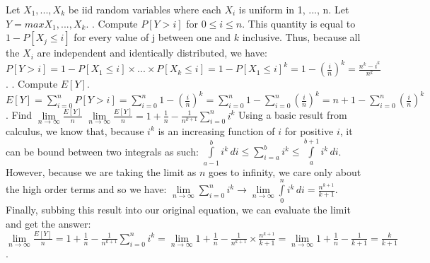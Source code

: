 \documentclass[12pt]{article}
\begin{document}

Let $X_1, ..., X_k$ be iid random variables where each $X_i$ is uniform in {1, ..., n}. Let $Y = max{X_1, ..., X_k}$.
\newline
{}. Compute $P[Y>i]$ for $0 \leq i \leq n$.
\newline
\newline
This quantity is equal to $1 - P[X_j \leq i]$ for every value of j between one and $k$ inclusive. Thus, 
because all the $X_i$ are independent and identically distributed, we have:
\newline
\newline
$P[Y > i] = 1 - P[X_1 \leq i] \times ... \times P[X_k \leq i] = 1 - P[X_1 \leq i]^k = 1 - (\frac{i}{n})^k = \frac{n^k - i^k}{n^k}$.
\newline
{}. Compute $E[Y]$.
\newline
\newline
$E[Y] = \sum\limits_{i=0}^{n} P[Y>i] = \sum\limits_{i=0}^{n} 1 - (\frac{i}{n})^k = \sum\limits_{i=0}^{n} 1 - \sum\limits_{i=0}^{n} (\frac{i}{n})^k = n + 1 - \sum\limits_{i=0}^{n} (\frac{i}{n})^k$
\newline
{}. Find $\lim\limits_{n \rightarrow \infty} \frac{E[Y]}{n}$
\newline
\newline
$\lim\limits_{n \rightarrow \infty} \frac{E[Y]}{n} = 1 + \frac{1}{n} - \frac{1}{n^{k+1}} \sum\limits_{i=0}^{n} i^k$
\newline
\newline
Using a basic result from calculus, we know that, because $i^k$ is an increasing function of $i$ for positive $i$, it
can be bound between two integrals as such:
\newline
\newline
$\int\limits_{a-1}^{b} i^k \,di \leq \sum\limits_{i=a}^{b} i^k \leq \int\limits_{a}^{b+1} i^k \, di$.
\newline
\newline
However, because we are taking the limit as $n$ goes to infinity, we care only about the high order terms and so we have:
\newline
\newline
$\lim\limits_{n \rightarrow \infty} \sum\limits_{i=0}^{n} i^k \rightarrow \lim\limits_{n \rightarrow \infty} \int\limits_{0}^{n} i^k \, di = \frac{n^{k+1}}{k+1}$.
\newline
\newline
Finally, subbing this result into our original equation, we can evaluate the limit and get the answer:
\newline
\newline
$\lim\limits_{n \rightarrow \infty} \frac{E[Y]}{n} = 1 + \frac{1}{n} - \frac{1}{n^{k+1}} \sum\limits_{i=0}^{n} i^k = \lim\limits_{n \rightarrow \infty} 1 + \frac{1}{n} - \frac{1}{n^{k+1}}
\times \frac{n^{k+1}}{k+1} = \lim\limits_{n \rightarrow \infty} 1 + \frac{1}{n} - \frac{1}{k+1} = \frac{k}{k+1}$.
\end{document}
